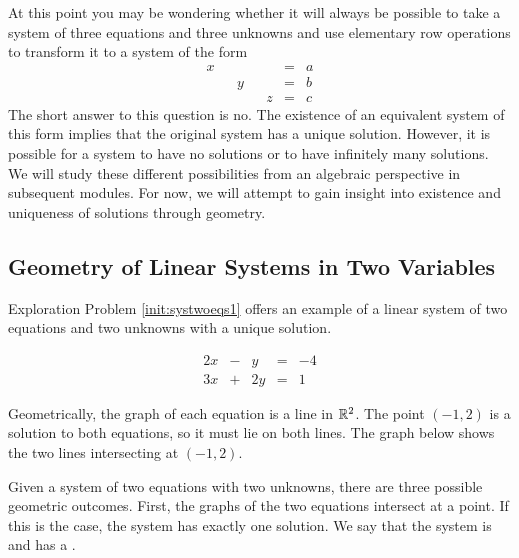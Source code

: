 \documentclass{ximera}
\begin{document}
At this point you may be wondering whether it will always be possible to take a system of three equations and three unknowns and use elementary row operations to transform it to a system of the form
$$\begin{array}{ccccccc}
      x & &&&&= &a \\
	 & &y&&&=&b\\
     & &&&z&=&c
    \end{array}$$
The short answer to this question is no.  The existence of an equivalent system of this form implies that the original system has a unique solution.  However, it is possible for a system to have no solutions or to have infinitely many solutions.  We will study these different possibilities from an algebraic perspective in subsequent modules.  For now, we will attempt to gain insight into existence and uniqueness of solutions through geometry.     

\subsection*{Geometry of Linear Systems in Two Variables}
Exploration Problem \ref{init:systwoeqs1} offers an example of a linear system of two equations and two unknowns with a unique solution.  

$$\begin{array}{ccccc}
      2x& -&y&=&-4\\
      3x & +&2y&= &1 
    \end{array}$$

Geometrically, the graph of each equation is a line in $\mathbb{R}^2$.  The point $(-1, 2)$ is a solution to both equations, so it must lie on both lines.
  The graph below shows the two lines intersecting at $(-1, 2)$.    
    
\begin{center}
\end{center}

Given a system of two equations with two unknowns, there are three possible geometric outcomes.  First, the graphs of the two equations intersect at a point.  If this is the case, the system has exactly one solution. We say that the system is  and has a .  
\end{document}
